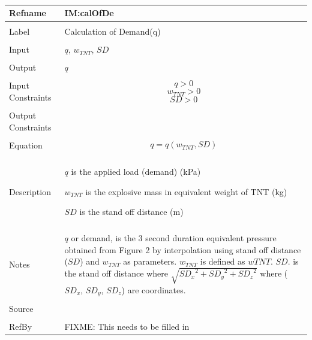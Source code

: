 \documentclass[12pt]{article}
\begin{document}
~\newline
\noindent \begin{minipage}{\textwidth}
\begin{tabular}{p{} p{}}
\toprule \textbf{Refname} & \textbf{IM:calOfDe}
\label{IM:calOfDe}
\\ \midrule \\
Label & Calculation of Demand(q)
\\ \midrule \\
Input & $q$, ${w_{TNT}}$, $SD$
\\ \midrule \\
Output & $q$
\\ \midrule \\
Input Constraints & \begin{dmath}
                    q>0
                    \end{dmath}
                    \begin{dmath}
                    {w_{TNT}}>0
                    \end{dmath}
                    \begin{dmath}
                    SD>0
                    \end{dmath}
\\ \midrule \\
Output Constraints & 
\\ \midrule \\
Equation & \begin{dmath}
           q=q\left({w_{TNT}},SD\right)
           \end{dmath}
\\ \midrule \\
Description & \begin{symbDescription}
              \item{$q$ is the applied load (demand) (kPa)}
              \item{${w_{TNT}}$ is the explosive mass in equivalent weight of TNT (kg)}
              \item{$SD$ is the stand off distance (m)}
              \end{symbDescription}
\\ \midrule \\
Notes & $q$ or demand, is the 3 second duration equivalent pressure obtained from Figure 2 by interpolation using stand off distance ($SD$) and ${w_{TNT}}$ as parameters. ${w_{TNT}}$ is defined as $w TNT$. $SD$. is the stand off distance where $\sqrt{{SD_{x}}^{2}+{SD_{y}}^{2}+{SD_{z}}^{2}}$ where (${SD_{x}}$, ${SD_{y}}$, ${SD_{z}}$) are coordinates.
\\ \midrule \\
Source & 
\\ \midrule \\
RefBy & FIXME: This needs to be filled in
\\ \bottomrule \end{tabular}
\end{minipage}\\
\end{document}
